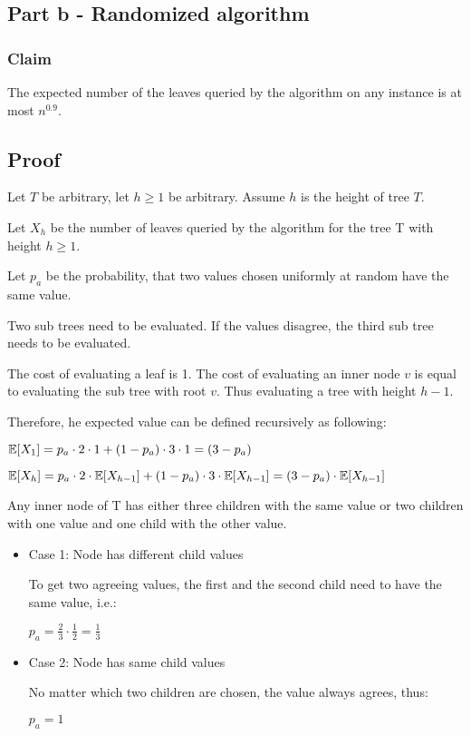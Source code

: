 \subsection*{Part b - Randomized algorithm}

\subsubsection*{Claim}

The expected number of the leaves queried by the algorithm on any instance is at most $n^{0.9}$.

\subsection*{Proof}

Let $T$ be arbitrary, let $h \geq 1$ be arbitrary. Assume $h$ is the height of tree $T$.

Let $X_h$ be the number of leaves queried by the algorithm for the tree T with height $h \geq 1$.

Let $p_a$ be the probability, that two values chosen uniformly at random have the same value.

Two sub trees need to be evaluated. If the values disagree, the third sub tree needs to be evaluated. 

The cost of evaluating a leaf is 1. The cost of evaluating an inner node $v$ is equal to evaluating the sub tree with root $v$. Thus evaluating a tree with height $h - 1$.

Therefore, he expected value can be defined recursively as following:

$\mathbb{E}[X_1] = 
p_a \cdot 2 \cdot 1 + (1 - p_a) \cdot 3 \cdot 1 =
(3 - p_a)$

$\mathbb{E}[X_h] = 
p_a \cdot 2 \cdot \mathbb{E}[X_{h - 1}] + (1 - p_a) \cdot 3 \cdot \mathbb{E}[X_{h - 1}] =
(3 - p_a) \cdot \mathbb{E}[X_{h-1}]
$

Any inner node of T has either three children with the same value or two children with one value and one child with the other value.

\begin{itemize}
    \item Case 1: Node has different child values
    
    To get two agreeing values, the first and the second child need to have the same value, i.e.:
    
    $p_a = \frac{2}{3} \cdot \frac{1}{2} = \frac{1}{3}$
    
    \item Case 2: Node has same child values
    
    No matter which two children are chosen, the value always agrees, thus: 
    
    $p_a = 1$
    
\end{itemize}

